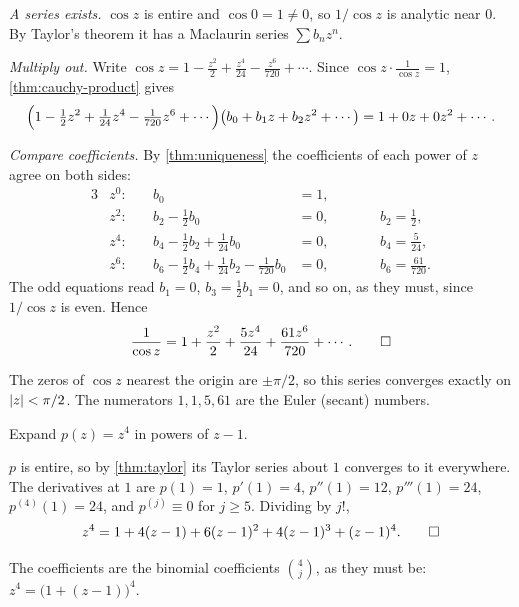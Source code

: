 \begin{solution}
  \emph{A series exists.} $\cos z$ is entire and $\cos 0 = 1 \neq 0$, so
  $1/\cos z$ is analytic near $0$. By Taylor's theorem it has a Maclaurin
  series $\sum b_n z^n$.

  \emph{Multiply out.} Write
  $\cos z = 1 - \frac{z^2}{2} + \frac{z^4}{24} - \frac{z^6}{720} + \dotsb$.
  Since $\cos z \cdot \frac{1}{\cos z} = 1$, \cref{thm:cauchy-product} gives
  \[
    \Bigl(1 - \tfrac12 z^2 + \tfrac1{24} z^4 - \tfrac1{720} z^6 + \dotsb\Bigr)
    \bigl(b_0 + b_1 z + b_2 z^2 + \dotsb\bigr)
    = 1 + 0z + 0z^2 + \dotsb.
  \]

  \emph{Compare coefficients.} By \cref{thm:uniqueness} the coefficients of
  each power of $z$ agree on both sides:
  \begin{alignat*}{3}
    & z^0\colon\quad & b_0 &= 1, \\
    & z^2\colon & b_2 - \tfrac12 b_0 &= 0, &\qquad& b_2 = \tfrac12, \\
    & z^4\colon & b_4 - \tfrac12 b_2 + \tfrac1{24} b_0 &= 0, && b_4 = \tfrac{5}{24}, \\
    & z^6\colon & b_6 - \tfrac12 b_4 + \tfrac1{24} b_2 - \tfrac1{720} b_0 &= 0, &&
      b_6 = \tfrac{61}{720}.
  \end{alignat*}
  The odd equations read $b_1 = 0$, $b_3 = \frac12 b_1 = 0$, and so on, as
  they must, since $1/\cos z$ is even. Hence
  \[
    \frac{1}{\cos z} = 1 + \frac{z^2}{2} + \frac{5 z^4}{24}
      + \frac{61 z^6}{720} + \dotsb. \qedhere
  \]
\end{solution}

\begin{remark}
  The zeros of $\cos z$ nearest the origin are $\pm \pi/2$, so this series
  converges exactly on $\lvert z\rvert < \pi/2$. The numerators $1, 1, 5, 61$ are the
  Euler (secant) numbers.
\end{remark}

\begin{exercise}\label{ex:z-fourth-about-one}
  Expand $p(z) = z^4$ in powers of $z - 1$.
\end{exercise}

\begin{solution}
  $p$ is entire, so by \cref{thm:taylor} its Taylor series about $1$ converges
  to it everywhere. The derivatives at $1$ are
  $p(1) = 1$, $p'(1) = 4$, $p''(1) = 12$, $p'''(1) = 24$, $p^{(4)}(1) = 24$, and
  $p^{(j)} \equiv 0$ for $j \geq 5$. Dividing by $j!$,
  \[
    z^4 = 1 + 4(z - 1) + 6(z - 1)^2 + 4(z - 1)^3 + (z - 1)^4. \qedhere
  \]
\end{solution}

\begin{remark}
  The coefficients are the binomial coefficients $\binom{4}{j}$, as they must
  be: $z^4 = \bigl(1 + (z - 1)\bigr)^4$.
\end{remark}
